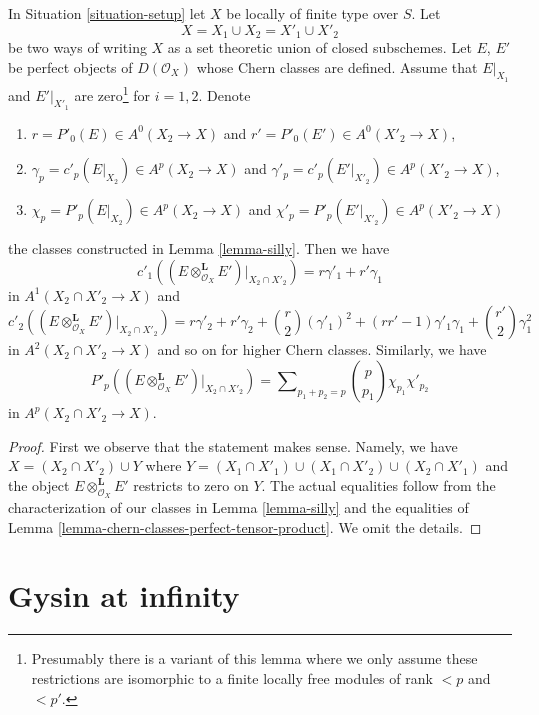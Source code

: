\begin{lemma}
\label{lemma-silly-tensor-product}
In Situation \ref{situation-setup} let $X$ be locally of finite type over $S$.
Let
$$
X = X_1 \cup X_2 = X'_1 \cup X'_2
$$
be two ways of writing $X$ as a set theoretic union of closed subschemes.
Let $E$, $E'$ be perfect objects of $D(\mathcal{O}_X)$
whose Chern classes are defined.
Assume that $E|_{X_1}$ and $E'|_{X'_1}$ are zero\footnote{Presumably there
is a variant of this lemma where we only assume these restrictions are
isomorphic to a finite locally free modules
of rank $< p$ and $< p'$.} for $i = 1, 2$. Denote
\begin{enumerate}
\item $r = P'_0(E) \in A^0(X_2 \to X)$ and
$r' = P'_0(E') \in A^0(X'_2 \to X)$,
\item $\gamma_p = c'_p(E|_{X_2}) \in A^p(X_2 \to X)$ and
$\gamma'_p = c'_p(E'|_{X'_2}) \in A^p(X'_2 \to X)$,
\item $\chi_p = P'_p(E|_{X_2}) \in A^p(X_2 \to X)$ and
$\chi'_p = P'_p(E'|_{X'_2}) \in A^p(X'_2 \to X)$
\end{enumerate}
the classes constructed in Lemma \ref{lemma-silly}. Then we have
$$
c'_1((E \otimes_{\mathcal{O}_X}^\mathbf{L} E')|_{X_2 \cap X'_2}) =
r \gamma'_1 + r' \gamma_1
$$
in $A^1(X_2 \cap X'_2 \to X)$ and
$$
c'_2((E \otimes_{\mathcal{O}_X}^\mathbf{L} E')|_{X_2 \cap X'_2}) =
r \gamma'_2 + r' \gamma_2 + {r \choose 2} (\gamma'_1)^2 +
(rr' - 1) \gamma'_1\gamma_1 + {r' \choose 2} \gamma_1^2
$$
in $A^2(X_2 \cap X'_2 \to X)$ and so on for higher Chern classes.
Similarly, we have
$$
P'_p((E \otimes_{\mathcal{O}_X}^\mathbf{L} E')|_{X_2 \cap X'_2}) =
\sum\nolimits_{p_1 + p_2 = p}
{p \choose p_1} \chi_{p_1} \chi'_{p_2}
$$
in $A^p(X_2 \cap X'_2 \to X)$.
\end{lemma}

\begin{proof}
First we observe that the statement makes sense. Namely, we have
$X = (X_2 \cap X'_2) \cup Y$ where
$Y = (X_1 \cap X'_1) \cup (X_1 \cap X'_2) \cup (X_2 \cap X'_1)$
and the object $E \otimes_{\mathcal{O}_X}^\mathbf{L} E'$
restricts to zero on $Y$.
The actual equalities follow from the characterization
of our classes in Lemma \ref{lemma-silly}
and the equalities of Lemma \ref{lemma-chern-classes-perfect-tensor-product}.
We omit the details.
\end{proof}







\section{Gysin at infinity}
\label{section-gysin-at-infty}

